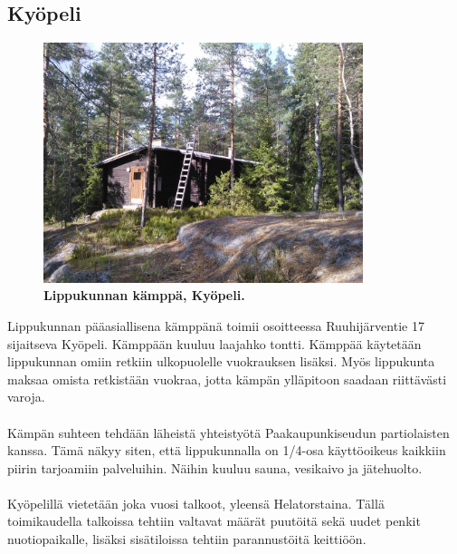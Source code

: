 \documentclass[a4paper, 12pt, finnish]{report} %
\begin{document}
\subsection{Kyöpeli}
\begin{figure}[htb]
	\begin{center}
		\includegraphics[height=7cm]{kyopeli.jpg}
	\end{center}
	\captionsetup{labelformat=empty}
	\caption{\textbf{Lippukunnan kämppä, Kyöpeli.}}
\end{figure}

Lippukunnan pääasiallisena kämppänä toimii osoitteessa Ruuhijärventie 17 sijaitseva Kyöpeli. Kämppään kuuluu laajahko tontti. Kämppää käytetään lippukunnan omiin retkiin ulkopuolelle vuokrauksen lisäksi. Myös lippukunta maksaa omista retkistään vuokraa, jotta kämpän ylläpitoon saadaan riittävästi varoja.\\
\\Kämpän suhteen tehdään läheistä yhteistyötä Paakaupunkiseudun partiolaisten kanssa. Tämä näkyy siten, että lippukunnalla on 1/4-osa käyttöoikeus kaikkiin piirin tarjoamiin palveluihin. Näihin kuuluu sauna, vesikaivo ja jätehuolto.\\
\\Kyöpelillä vietetään joka vuosi talkoot, yleensä Helatorstaina. Tällä toimikaudella talkoissa tehtiin valtavat määrät puutöitä sekä uudet penkit nuotiopaikalle, lisäksi sisätiloissa tehtiin parannustöitä keittiöön.
\newpage
\end{document}
